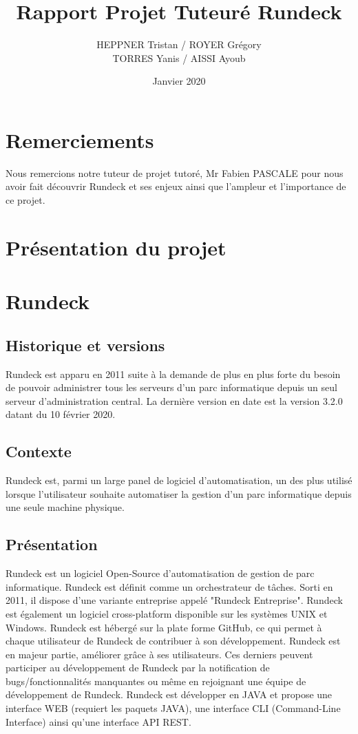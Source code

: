 \documentclass[12pt]{article}
\title{Rapport Projet Tuteuré Rundeck}
\author{HEPPNER Tristan / ROYER Grégory
\\
TORRES Yanis / AISSI Ayoub }
\date{Janvier 2020}
\begin{document}
\maketitle
\newpage
\tableofcontents
\newpage
\section{Remerciements}

Nous remercions notre tuteur de projet tutoré, Mr Fabien PASCALE pour nous avoir fait découvrir Rundeck et ses enjeux ainsi que l'ampleur et l'importance de ce projet.

\newpage
\section{Présentation du projet}

\section{Rundeck}
\subsection{Historique et versions}

Rundeck est apparu en 2011 suite à la demande de plus en plus forte du besoin de pouvoir administrer tous les serveurs d'un parc informatique depuis un seul serveur d'administration central. La dernière version en date est la version 3.2.0 datant du 10 février 2020.

\subsection{Contexte}

Rundeck est, parmi un large panel de logiciel d'automatisation, un des plus utilisé lorsque l'utilisateur souhaite automatiser la gestion d'un parc informatique depuis une seule machine physique.

\subsection{Présentation}

Rundeck est un logiciel Open-Source d'automatisation de gestion de parc informatique. Rundeck est définit comme un orchestrateur de tâches. Sorti en 2011, il dispose d'une variante entreprise appelé "Rundeck Entreprise". Rundeck est également un logiciel cross-platform disponible sur les systèmes UNIX et Windows. Rundeck est hébergé sur la plate forme GitHub, ce qui permet à chaque utilisateur de Rundeck de contribuer à son développement. Rundeck est en majeur partie, améliorer grâce à ses utilisateurs. Ces derniers peuvent participer au développement de Rundeck par la notification de bugs/fonctionnalités manquantes ou même en rejoignant une équipe de développement de Rundeck. Rundeck est développer en JAVA et propose une interface WEB (requiert les paquets JAVA), une interface CLI (Command-Line Interface) ainsi qu'une interface API REST.
\end{document}
